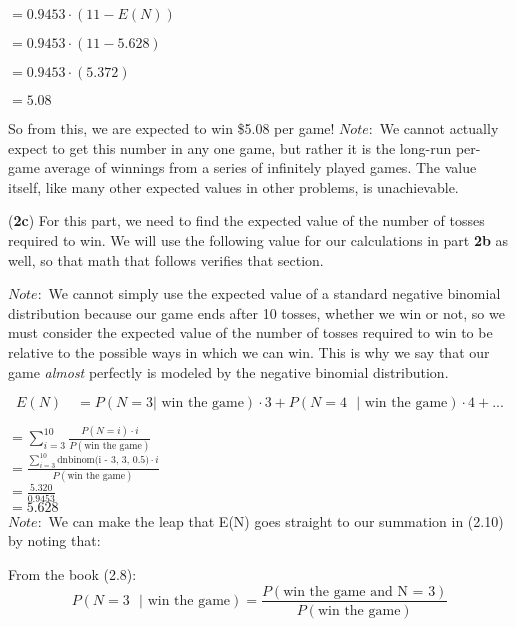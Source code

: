\documentclass{article}
\begin{document}
\qquad\qquad $= 0.9453 \cdot (11 - E(N))$
    
\qquad\qquad $= 0.9453 \cdot (11 - 5.628)$
    
\qquad\qquad $= 0.9453 \cdot (5.372)$

\qquad\qquad $= 5.08$

So from this, we are expected to win \$5.08 per game!
$Note:$ We cannot actually expect to get this number in any one game, but rather it is the long-run per-game average of winnings from a series of infinitely played games.  The value itself, like many other expected values in other problems, is unachievable.
\\
\item(\textbf{2c})
For this part, we need to find the expected value of the number of tosses required to win. We will use the following value for our calculations in part \textbf{2b} as well, so that math that follows verifies that section.

$Note:$ We cannot simply use the expected value of a standard negative binomial distribution because our game ends after 10 tosses, whether we win or not, so we must consider the expected value of the number of tosses required to win to be relative to the possible ways in which we can win.  This is why we say that our game \textit{almost} perfectly is modeled by the negative binomial distribution.

\begin{equation}
    E(N) \quad = P( N = 3 \text{$|$ win the game}) \cdot 3 + P(N = 4 \text{ $|$ win the game}) \cdot 4 + ...
\end{equation}

\qquad\quad $= \sum_{i=3}^{10} \text{$\frac{P(N = i) \cdot i}{P(\text{win the game})}$}$ \\
      
      
\qquad\quad $= \frac{\sum_{i=3}^{10} \text{dnbinom(i - 3, 3, 0.5)} \cdot i}{P(\text{win the game})}$ \\
      
\qquad\quad $= \text{$\frac{5.320}{0.9453}$}$ \\
      
\qquad\quad $= 5.628$ \\ 


$Note:$ We can make the leap that E(N) goes straight to our summation in (2.10) by noting that: 

From the book (2.8):
\begin{equation}
P(N = 3 \text{ $|$ win the game}) = \frac{P(\text{win the game and N = 3})}{P(\text{win the game})}
\end{equation}
\end{document}
